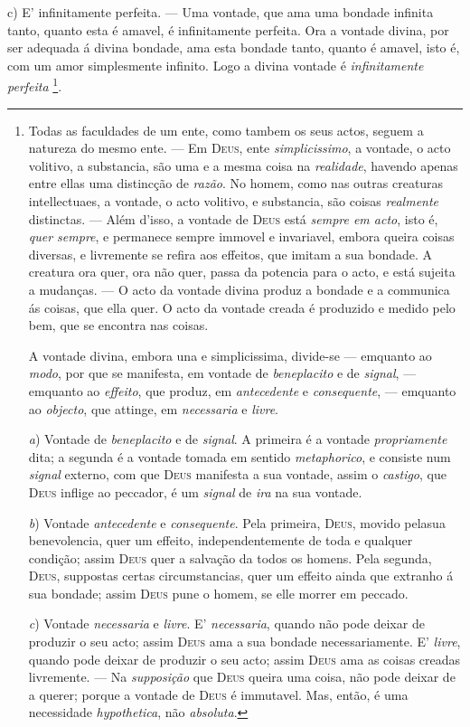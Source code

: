 c) E' infinitamente perfeita. --- Uma vontade, que ama uma bondade infinita tanto, quanto esta é amavel, é infinitamente perfeita. Ora a vontade divina, por ser adequada á divina bondade, ama esta bondade tanto, quanto é amavel, isto é, com um amor simplesmente infinito. Logo a divina vontade é \emph{infinitamente perfeita} \footnote{Todas as faculdades de um ente, como tambem os seus actos, seguem a natureza do mesmo ente. --- Em \textsc{Deus}, ente \emph{simplicissimo}, a vontade, o acto volitivo, a substancia, são uma e a mesma coisa na \emph{realidade}, havendo apenas entre ellas uma distincção de \emph{razão}. No homem, como nas outras creaturas intellectuaes, a vontade, o acto volitivo, e substancia, são coisas \emph{realmente} distinctas. --- Além d'isso, a vontade de \textsc{Deus} está \emph{sempre em acto}, isto é, \emph{quer sempre}, e permanece sempre immovel e invariavel, embora queira coisas diversas, e livremente se refira aos effeitos, que imitam a sua bondade. A creatura ora quer, ora não quer, passa da potencia para o acto, e está sujeita a mudanças. --- O acto da vontade divina produz a bondade e a communica ás coisas, que ella quer. O acto da vontade creada é produzido e medido pelo bem, que se encontra nas coisas.\par *\par A vontade divina, embora una e simplicissima, divide-se --- emquanto ao \emph{modo}, por que se manifesta, em vontade de \emph{beneplacito} e de \emph{signal}, --- emquanto ao \emph{effeito}, que produz, em \emph{antecedente} e \emph{consequente}, --- emquanto ao \emph{objecto}, que attinge, em \emph{necessaria} e \emph{livre}.\par \emph{a}) Vontade de \emph{beneplacito} e de \emph{signal}. A primeira é a vontade \emph{propriamente} dita; a segunda é a vontade tomada em sentido \emph{metaphorico}, e consiste num \emph{signal} externo, com que \textsc{Deus} manifesta a sua vontade, assim o \emph{castigo}, que \textsc{Deus} inflige ao peccador, é um \emph{signal} de \emph{ira} na sua vontade.\par \emph{b}) Vontade \emph{antecedente} e \emph{consequente}. Pela primeira, \textsc{Deus}, movido pelasua benevolencia, quer um effeito, independentemente de toda e qualquer condição; assim \textsc{Deus} quer a salvação da todos os homens. Pela segunda, \textsc{Deus}, suppostas certas circumstancias, quer um effeito ainda que extranho á sua bondade; assim \textsc{Deus} pune o homem, se elle morrer em peccado.\par \emph{c}) Vontade \emph{necessaria} e \emph{livre}. E' \emph{necessaria}, quando não pode deixar de produzir o seu acto; assim \textsc{Deus} ama a sua bondade necessariamente. E' \emph{livre}, quando pode deixar de produzir o seu acto; assim \textsc{Deus} ama as coisas creadas livremente. --- Na \emph{supposição} que \textsc{Deus} queira uma coisa, não pode deixar de a querer; porque a vontade de \textsc{Deus} é immutavel. Mas, então, é uma necessidade \emph{hypothetica}, não \emph{absoluta}.}.

